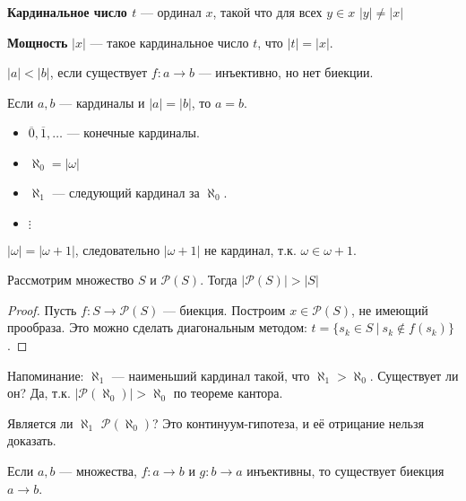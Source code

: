 \begin{definition}
    \textbf{Кардинальное число \(t\)} --- ординал \(x\), такой что для всех \(y \in x\) \(|y| \neq |x|\)
\end{definition}

\begin{definition}
    \textbf{Мощность} \(|x|\) --- такое кардинальное число \(t\), что \(|t| = |x|\).
\end{definition}

\begin{definition}
    \(|a| < |b|\), если существует \(f : a \to b\) --- инъективно, но нет биекции.
\end{definition}

\begin{statement}
    Если \(a, b\) --- кардиналы и \(|a| = |b|\), то \(a = b\).
\end{statement}

\begin{itemize}
    \item \(\overline 0, \overline 1, \dots \) --- конечные кардиналы.
    \item \(\aleph_0 = |\omega|\)
    \item \(\aleph_1\) --- следующий кардинал за \(\aleph_0\).
    \item \(\vdots\)
\end{itemize}

\begin{example}
    \(|\omega| = |\omega + 1|\), следовательно \(|\omega + 1|\) не кардинал, т.к. \(\omega \in \omega + 1\).
\end{example}

\begin{theorem}[Кантора]
    Рассмотрим множество \(S\) и \(\mathcal{P}(S)\). Тогда \(|\mathcal{P}(S)| > |S|\)
\end{theorem}
\begin{proof}
    Пусть \(f : S \to \mathcal{P}(S)\) --- биекция. Построим \(x \in \mathcal{P}(S)\), не имеющий прообраза. Это можно сделать диагональным методом: \(t = \{s_k \in S\ |\ s_k \notin f(s_k)\}\).
\end{proof}

Напоминание: \(\aleph_1\) --- наименьший кардинал такой, что \(\aleph_1 > \aleph_0\). Существует ли он? Да, т.к. \(|\mathcal{P}(\aleph_0)| > \aleph_0\) по теореме кантора.

Является ли \(\aleph_1\) \(\mathcal{P}(\aleph_0)\)? Это континуум-гипотеза, и её отрицание нельзя доказать.

\begin{theorem}
    Если \(a, b\) --- множества, \(f : a \to b\) и \(g : b \to a\) инъективны, то существует биекция \(a \to b\).
\end{theorem}
